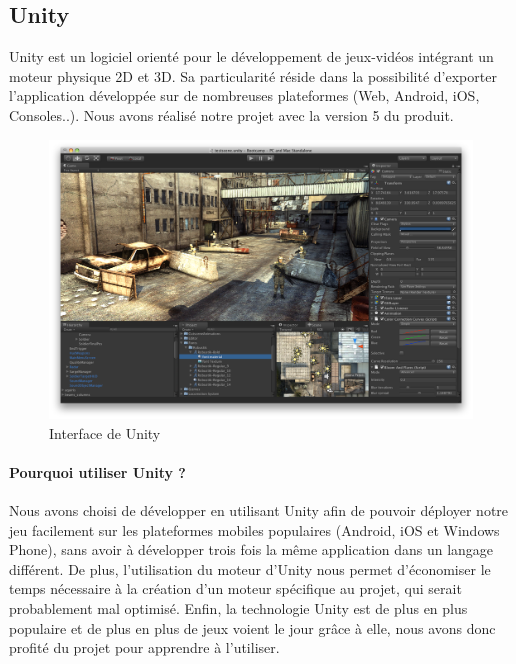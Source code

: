 \subsection{Unity}

Unity est un logiciel orienté pour le développement de jeux-vidéos intégrant un moteur physique 2D et 3D. Sa particularité réside dans la possibilité d'exporter l'application développée sur de nombreuses plateformes (Web, Android, iOS, Consoles..). Nous avons réalisé notre projet avec la version 5 du produit.


\begin{figure}[H]\centering
  \includegraphics[scale=.28]{./img/unity-3D.png}
  \caption{Interface de Unity}
  \label{unity}
\end{figure}

\paragraph{Pourquoi utiliser Unity ?}

Nous avons choisi de développer en utilisant Unity afin de pouvoir déployer notre jeu facilement sur les plateformes mobiles populaires (Android, iOS et Windows Phone), sans avoir à développer trois fois la même application dans un langage différent. De plus, l'utilisation du moteur d'Unity nous permet d'économiser le temps nécessaire à la création d'un moteur spécifique au projet, qui serait probablement mal optimisé. Enfin, la technologie Unity est de plus en plus populaire et de plus en plus de jeux voient le jour grâce à elle, nous avons donc profité du projet pour apprendre à l'utiliser.
 
